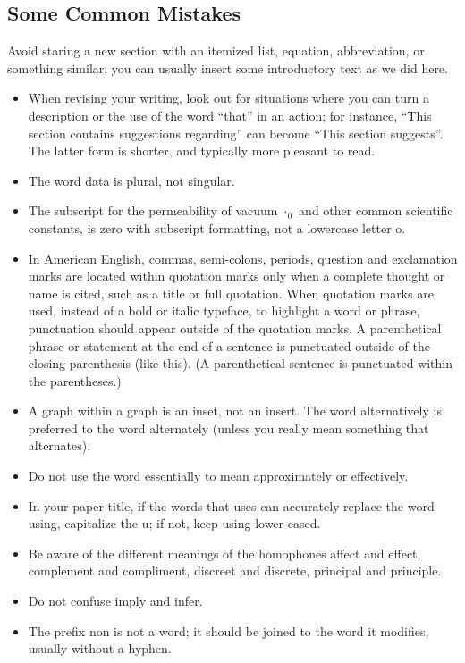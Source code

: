 \documentclass[letterpaper, 10 pt, conference]{ieeeconf}
\begin{document}
\subsection{Some Common Mistakes}\label{sec:mistakes}
Avoid staring a new section with an itemized list, equation, abbreviation, or something similar; you can usually insert some introductory text as we did here.
\begin{itemize}
\item When revising your writing, look out for situations where you can turn a description or the use of the word ``that'' in an action; for instance, ``This section contains suggestions regarding'' can become ``This section suggests''. %
  The latter form is shorter, and typically more pleasant to read.
\item The word data is plural, not singular.
\item The subscript for the permeability of vacuum $\cdot_0$ and other common scientific constants, is zero with subscript formatting, not a lowercase letter o.
\item In American English, commas, semi-colons, periods, question and exclamation marks are located within quotation marks only when a complete thought or name is cited, such as a title or full quotation. When quotation marks are used, instead of a bold or italic typeface, to highlight a word or phrase, punctuation should appear outside of the quotation marks. A parenthetical phrase or statement at the end of a sentence is punctuated outside of the closing parenthesis (like this). (A parenthetical sentence is punctuated within the parentheses.)
\item A graph within a graph is an inset, not an insert. The word alternatively is preferred to the word alternately (unless you really mean something that alternates).
\item Do not use the word essentially to mean approximately or effectively.
\item In your paper title, if the words that uses can accurately replace the word using, capitalize the u; if not, keep using lower-cased.
\item Be aware of the different meanings of the homophones affect and effect, complement and compliment, discreet and discrete, principal and principle.
\item Do not confuse imply and infer.
\item The prefix non is not a word; it should be joined to the word it modifies, usually without a hyphen.

\end{itemize}
\end{document}
